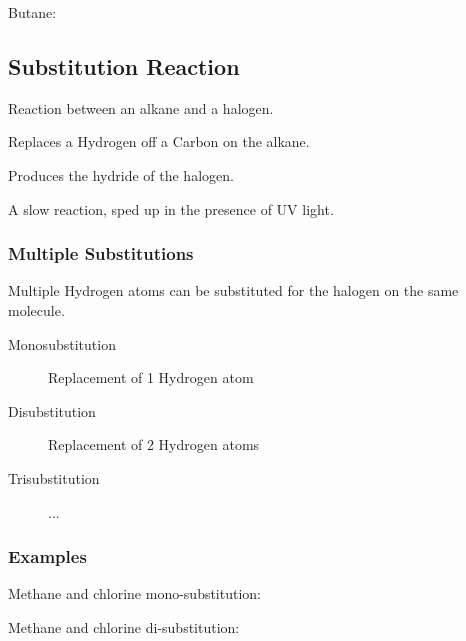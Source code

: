 \documentclass[a4paper,11pt]{article}
\begin{document}
Butane:

\begin{center}
\end{center}


\subsection{Substitution Reaction}

Reaction between an alkane and a halogen.

Replaces a Hydrogen off a Carbon on the alkane.

Produces the hydride of the halogen.

A slow reaction, sped up in the presence of UV light.


\subsubsection{Multiple Substitutions}

Multiple Hydrogen atoms can be substituted for the halogen on the same molecule.

\begin{description}
\item [Monosubstitution] Replacement of 1 Hydrogen atom
\item [Disubstitution] Replacement of 2 Hydrogen atoms
\item [Trisubstitution] ...
\end{description}


\subsubsection{Examples}

Methane and chlorine mono-substitution:

\begin{center}
\end{center}

Methane and chlorine di-substitution:

\begin{center}
\end{center}
\end{document}
